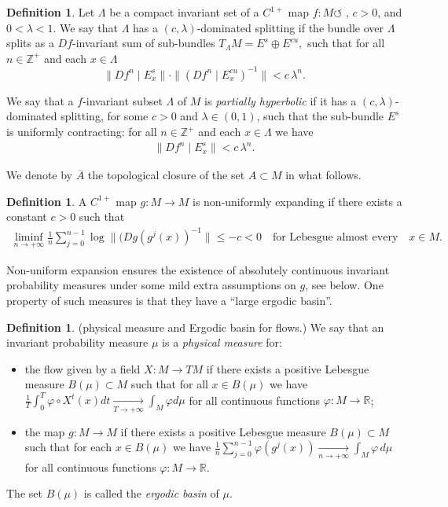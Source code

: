 \documentclass[reqno,12pt,a4paper]{amsart}
\theoremstyle{plain}
\theoremstyle{definition}
\newtheorem{definition}[theorem]{Definition}
\begin{document}
\begin{definition}
\label{d.dominado}
Let $\Lambda$ be a compact invariant set of a $C^{1+}$ map
$f:M\circlearrowleft$ , $c>0$, and $0 < \lambda < 1$.  We
say that $\Lambda$ has a $(c,\lambda)$-dominated splitting
if the bundle over $\Lambda$ splits as a $Df$-invariant sum
of sub-bundles $ T_\Lambda M=E^s\oplus E^{cu}, $ such that
for all $n\in{{\mathbb Z}}^+$ and each $x \in \Lambda$
\begin{equation}\label{eq.domination}
\|Df^n \mid E^s_x\| \cdot \|(Df^{n} \mid E^{cu}_{x})^{-1}\| < c \,
\lambda^n.
\end{equation}
\end{definition}

We say that a $f$-invariant subset $\Lambda$ of $M$ is
\emph{partially hyperbolic} if it has a
$(c,\lambda)$-dominated splitting, for some $c>0$ and
$\lambda\in(0,1)$, such that the sub-bundle $E^s$ is
uniformly contracting: for all $n\in{{\mathbb Z}}^+$ and each $x \in
\Lambda$ we have
\begin{align}\label{eq:unif-contr}
  \|Df^n \mid E^s_x\| < c \, \lambda^n.
\end{align}

We denote by $\overline{A}$ the topological closure of the
set $A\subset M$ in what follows.

\begin{definition}
  \label{def:NUE}
  A $C^{1+}$ map $g:M\to M$ is non-uniformly expanding if
  there exists a constant $c>0$ such that
  \begin{align*}
    \liminf_{n\to+\infty}
    \frac1n\sum_{j=0}^{n-1}\log\|(Dg(g^j(x))^{-1}\| \le -c<0 \quad\text{for
      Lebesgue almost every}\quad x\in M.
  \end{align*}
\end{definition}

Non-uniform expansion ensures the existence of absolutely
continuous invariant probability measures under some mild
extra assumptions on $g$, see below. One property of such
measures is that they have a ``large ergodic basin''.

\begin{definition}{(physical measure and Ergodic basin for flows.)}
  We say that an invariant probability measure $\mu$ is a
  {\em physical measure} for:
  \begin{itemize}\item 
    the flow given by a field $X:M \to TM$ if there exists a
    positive Lebesgue measure $B(\mu)\subset M$ such that
    for all $x \in B(\mu)$ we have
$
\frac{1}{T} \int_{0}^T {\varphi} \circ X^t(x) dt
\xrightarrow[T\to+\infty]{} \int_M {\varphi} d\mu
$
for all continuous functions ${\varphi}:M\to{{\mathbb R}}$;
\item  the map $g:M\to M$ if there exists a positive
  Lebesgue measure $B(\mu)\subset M$ such that for each $x
  \in B(\mu)$ we have
$
\frac{1}{n} \sum_{j=0}^{n-1} {\varphi}(g^j(x))
\xrightarrow[n\to+\infty]{} \int_M {\varphi}\, d\mu
$
for all continuous functions ${\varphi}:M\to{{\mathbb R}}$.
\end{itemize}
The set $B(\mu)$ is
called the {\em ergodic basin} of $\mu$.
\end{definition}
\end{document}
